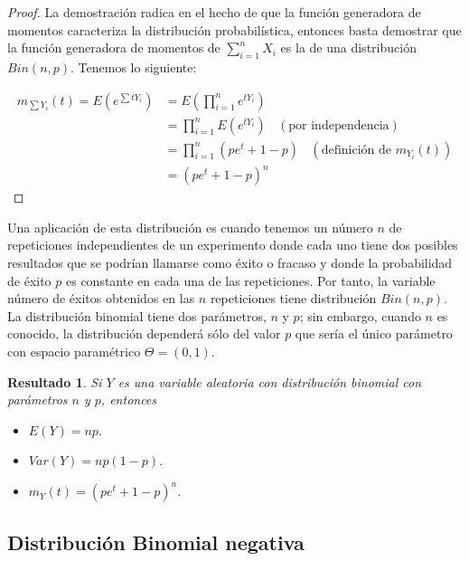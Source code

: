 \documentclass[
  10pt,
  spanish,
]{book}
\providecommand{\tightlist}{%
  \setlength{\itemsep}{0pt}\setlength{\parskip}{0pt}}
\newtheorem{proposition}{Resultado}[chapter]
\theoremstyle{definition}
\theoremstyle{definition}
\theoremstyle{definition}
\theoremstyle{definition}
\theoremstyle{remark}
\begin{document}
\begin{proof}
{}La demostración radica en el hecho de que la función generadora de momentos caracteriza la distribución probabilística, entonces basta demostrar que la función generadora de momentos de \(\sum_{i=1}^nX_i\) es la de una distribución \(Bin(n,p)\). Tenemos lo siguiente:

\begin{align*}
m_{\sum Y_i}(t)=E(e^{\sum tY_i})&=E(\prod_{i=1}^ne^{tY_i})\\
               &=\prod_{i=1}^nE(e^{tY_i})\ \ \ \ (\text{por independencia})\\
               &=\prod_{i=1}^n(pe^t+1-p)\ \ \ \ (\text{definición de $m_{Y_i}(t)$})\\
               &=(pe^t+1-p)^n
\end{align*}
\end{proof}

Una aplicación de esta distribución es cuando tenemos un número \(n\) de repeticiones independientes de un experimento donde cada uno tiene dos
posibles resultados que se podrían llamarse como éxito o fracaso y donde la probabilidad de éxito \(p\) es constante en cada una de las repeticiones. Por tanto, la variable número de éxitos obtenidos en las \(n\) repeticiones tiene distribución \(Bin(n,p)\). La distribución binomial tiene dos parámetros, \(n\) y \(p\); sin embargo, cuando \(n\) es conocido, la distribución dependerá sólo del valor \(p\) que sería el único parámetro con espacio paramétrico \(\Theta=(0,1)\).

\begin{proposition}
\protect\hypertarget{prp:unnamed-chunk-10}{}{\label{prp:unnamed-chunk-10} }Si \(Y\) es una variable aleatoria con distribución binomial con parámetros \(n\) y \(p\), entonces

\begin{itemize}
\tightlist
\item
  \(E(Y)=np\).
\item
  \(Var(Y)=np(1-p)\).
\item
  \(m_Y(t)=(pe^t+1-p)^n\).
\end{itemize}
\end{proposition}

\hypertarget{distribuciuxf3n-binomial-negativa}{%
\subsection{Distribución Binomial negativa}\label{distribuciuxf3n-binomial-negativa}}
\end{document}
